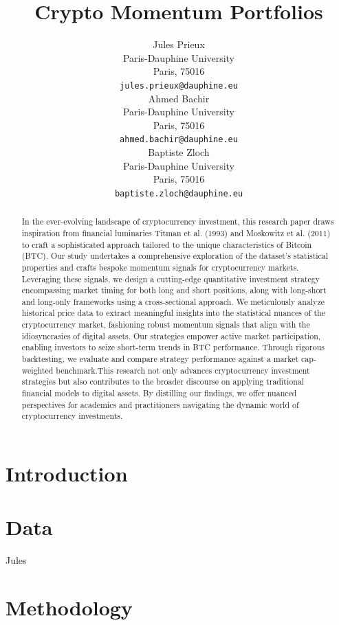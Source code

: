 \documentclass{article}
\title{Crypto Momentum Portfolios}
\author{
 Jules Prieux \\
  Paris-Dauphine University\\
  Paris, 75016  \\
  \texttt{jules.prieux@dauphine.eu} \\
   \And
 Ahmed Bachir \\
  Paris-Dauphine University\\
  Paris, 75016 \\
  \texttt{ahmed.bachir@dauphine.eu} \\
  \And
 Baptiste Zloch \\
  Paris-Dauphine University\\
  Paris, 75016 \\
  \texttt{baptiste.zloch@dauphine.eu} \\
}
\begin{document}
\maketitle
\begin{abstract}

	In the ever-evolving landscape of cryptocurrency investment, this research paper draws inspiration from financial luminaries Titman et al. (1993) \cite{Titman1993} and Moskowitz et al. (2011) \cite{Moskowitz2011} to craft a sophisticated approach tailored to the unique characteristics of Bitcoin (BTC). \newline
	Our study undertakes a comprehensive exploration of the dataset's statistical properties and crafts bespoke momentum signals for cryptocurrency markets. Leveraging these signals, we design a cutting-edge quantitative investment strategy encompassing market timing for both long and short positions, along with long-short and long-only frameworks using a cross-sectional approach. We meticulously analyze historical price data to extract meaningful insights into the statistical nuances of the cryptocurrency market, fashioning robust momentum signals that align with the idiosyncrasies of digital assets. Our strategies empower active market participation, enabling investors to seize short-term trends in BTC performance. Through rigorous backtesting, we evaluate and compare strategy performance against a market cap-weighted benchmark.This research not only advances cryptocurrency investment strategies but also contributes to the broader discourse on applying traditional financial models to digital assets. By distilling our findings, we offer nuanced perspectives for academics and practitioners navigating the dynamic world of cryptocurrency investments.
\end{abstract}



\section{Introduction}\label{sec:introduction}
\section{Data}\label{sec:data}
Jules
\section{Methodology}
\end{document}

